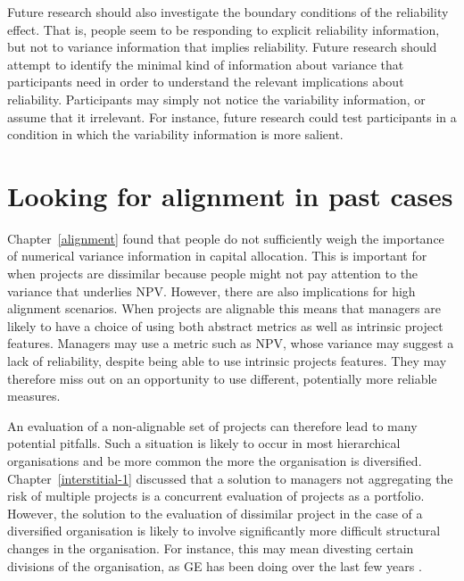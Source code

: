 \documentclass[a4paper, nobind, dvipsnames]{templates/ociamthesis}
\theoremstyle{definition}
\theoremstyle{definition}
\theoremstyle{definition}
\theoremstyle{definition}
\theoremstyle{remark}
\begin{document}
Future research should also investigate the boundary conditions of the
reliability effect. That is, people seem to be responding to explicit
reliability information, but not to variance information that implies
reliability. Future research should attempt to identify the minimal kind of
information about variance that participants need in order to understand the
relevant implications about reliability. Participants may simply not notice the
variability information, or assume that it irrelevant. For instance, future
research could test participants in a condition in which the variability
information is more salient.

\newpage

\printbibliography[segment=\therefsegment,heading=subbibintoc]

\hypertarget{interstitial-2}{%
\chapter{Looking for alignment in past cases}\label{interstitial-2}}

Chapter~\ref{alignment} found that people do not sufficiently weigh the
importance of numerical variance information in capital allocation. This is
important for when projects are dissimilar because people might not pay
attention to the variance that underlies NPV. However, there are also
implications for high alignment scenarios. When projects are alignable this
means that managers are likely to have a choice of using both abstract metrics
as well as intrinsic project features. Managers may use a metric such as NPV,
whose variance may suggest a lack of reliability, despite being able to use
intrinsic projects features. They may therefore miss out on an opportunity to
use different, potentially more reliable measures.

An evaluation of a non-alignable set of projects can therefore lead to many
potential pitfalls. Such a situation is likely to occur in most hierarchical
organisations and be more common the more the organisation is diversified.
Chapter~\ref{interstitial-1} discussed that a solution to managers not
aggregating the risk of multiple projects is a concurrent evaluation of projects
as a portfolio. However, the solution to the evaluation of dissimilar project in
the case of a diversified organisation is likely to involve significantly more
difficult structural changes in the organisation. For instance, this may mean
divesting certain divisions of the organisation, as GE has been doing over the
last few years \autocite{scott2018}.
\end{document}
